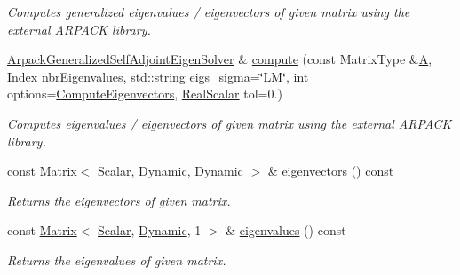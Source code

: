 \begin{DoxyCompactItemize}
\begin{DoxyCompactList}\small\item\em Computes generalized eigenvalues / eigenvectors of given matrix using the external A\+R\+P\+A\+CK library. \end{DoxyCompactList}\item 
\hyperlink{class_eigen_1_1_arpack_generalized_self_adjoint_eigen_solver}{Arpack\+Generalized\+Self\+Adjoint\+Eigen\+Solver} \& \hyperlink{class_eigen_1_1_arpack_generalized_self_adjoint_eigen_solver_a0e928eafffe83fba9be215b74e7105b7}{compute} (const Matrix\+Type \&\hyperlink{group___core___module_class_eigen_1_1_matrix}{A}, Index nbr\+Eigenvalues, std\+::string eigs\+\_\+sigma=\char`\"{}LM\char`\"{}, int options=\hyperlink{group__enums_ggae3e239fb70022eb8747994cf5d68b4a9ada93d8885bde32b876ba4af01d3292cc}{Compute\+Eigenvectors}, \hyperlink{class_eigen_1_1_arpack_generalized_self_adjoint_eigen_solver_a2555af55e53bf9de894a49e639be2e1e}{Real\+Scalar} tol=0.)
\begin{DoxyCompactList}\small\item\em Computes eigenvalues / eigenvectors of given matrix using the external A\+R\+P\+A\+CK library. \end{DoxyCompactList}\item 
const \hyperlink{group___core___module_class_eigen_1_1_matrix}{Matrix}$<$ \hyperlink{class_eigen_1_1_arpack_generalized_self_adjoint_eigen_solver_ab1182405bfe87a505d4b7a8311c661ec}{Scalar}, \hyperlink{namespace_eigen_ad81fa7195215a0ce30017dfac309f0b2}{Dynamic}, \hyperlink{namespace_eigen_ad81fa7195215a0ce30017dfac309f0b2}{Dynamic} $>$ \& \hyperlink{class_eigen_1_1_arpack_generalized_self_adjoint_eigen_solver_a183825135568364792a955efc55a0773}{eigenvectors} () const
\begin{DoxyCompactList}\small\item\em Returns the eigenvectors of given matrix. \end{DoxyCompactList}\item 
const \hyperlink{group___core___module_class_eigen_1_1_matrix}{Matrix}$<$ \hyperlink{class_eigen_1_1_arpack_generalized_self_adjoint_eigen_solver_ab1182405bfe87a505d4b7a8311c661ec}{Scalar}, \hyperlink{namespace_eigen_ad81fa7195215a0ce30017dfac309f0b2}{Dynamic}, 1 $>$ \& \hyperlink{class_eigen_1_1_arpack_generalized_self_adjoint_eigen_solver_ab46900dafdd11a8ac05a662c6b41480d}{eigenvalues} () const
\begin{DoxyCompactList}\small\item\em Returns the eigenvalues of given matrix. \end{DoxyCompactList}\item 

\end{DoxyCompactItemize}
